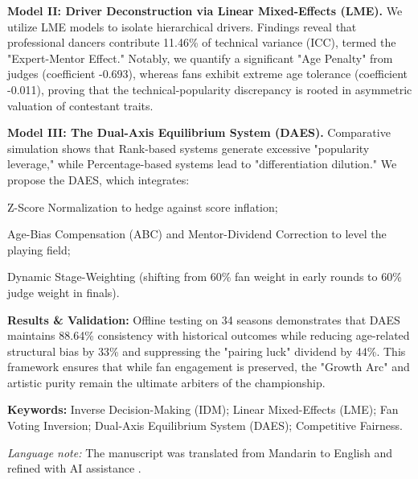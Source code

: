 \documentclass[12pt]{article}
\begin{document}
	\noindent \textbf{Model II: Driver Deconstruction via Linear Mixed-Effects (LME).} We utilize LME models to isolate hierarchical drivers. Findings reveal that professional dancers contribute 11.46\% of technical variance (ICC), termed the "Expert-Mentor Effect." Notably, we quantify a significant "Age Penalty" from judges (coefficient -0.693), whereas fans exhibit extreme age tolerance (coefficient -0.011), proving that the technical-popularity discrepancy is rooted in asymmetric valuation of contestant traits.
	
	\noindent \textbf{Model III: The Dual-Axis Equilibrium System (DAES).} Comparative simulation shows that Rank-based systems generate excessive "popularity leverage," while Percentage-based systems lead to "differentiation dilution." We propose the DAES, which integrates:
	
	Z-Score Normalization to hedge against score inflation;
	
	Age-Bias Compensation (ABC) and Mentor-Dividend Correction to level the playing field;
	
	Dynamic Stage-Weighting (shifting from 60\% fan weight in early rounds to 60\% judge weight in finals).
	
	\noindent \textbf{Results \& Validation:} Offline testing on 34 seasons demonstrates that DAES maintains 88.64\% consistency with historical outcomes while reducing age-related structural bias by 33\% and suppressing the "pairing luck" dividend by 44\%. This framework ensures that while fan engagement is preserved, the "Growth Arc" and artistic purity remain the ultimate arbiters of the championship.
	
	\vspace{1em}
	\noindent \textbf{Keywords:} Inverse Decision-Making (IDM); Linear Mixed-Effects (LME); Fan Voting Inversion; Dual-Axis Equilibrium System (DAES); Competitive Fairness.
	
	\vspace{0.5em}
	\noindent \footnotesize\textit{Language note:} The manuscript was translated from Mandarin to English and refined with AI assistance \cite{refAI}.
	
	\clearpage
	
	\thispagestyle{empty}
	{
		\setlength{\parskip}{0pt}
		\renewcommand{\baselinestretch}{0.8}
		\tableofcontents
	}
	\clearpage
	
	\setcounter{page}{3}
	\pagestyle{fancy}
	
\end{document}
